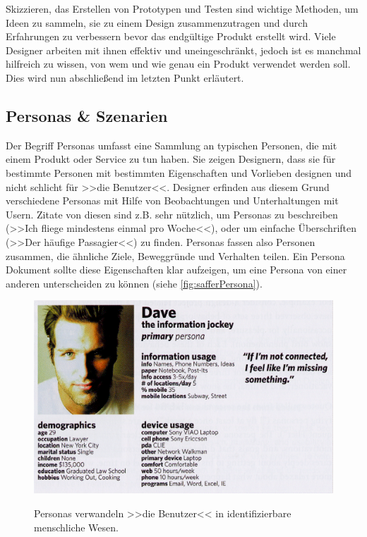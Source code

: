 \medskip Skizzieren, das Erstellen von Prototypen und Testen sind wichtige Methoden, um Ideen zu sammeln, sie zu einem Design zusammenzutragen und durch Erfahrungen zu verbessern bevor das endgültige Produkt erstellt wird. Viele Designer arbeiten mit ihnen effektiv und uneingeschränkt, jedoch ist es manchmal hilfreich zu wissen, von wem und wie genau ein Produkt verwendet werden soll. Dies wird nun abschließend im letzten Punkt erläutert.

\subsection{Personas \& Szenarien}  

Der Begriff Personas umfasst eine Sammlung an typischen Personen, die mit einem Produkt oder Service zu tun haben. Sie zeigen Designern, dass sie für bestimmte Personen mit bestimmten Eigenschaften und Vorlieben designen und nicht schlicht für >>die Benutzer<<. 
Designer erfinden aus diesem Grund verschiedene Personas mit Hilfe von Beobachtungen und Unterhaltungen mit Usern. Zitate von diesen sind z.B. sehr nützlich, um Personas zu beschreiben (>>Ich fliege mindestens einmal pro Woche<<), oder um einfache Überschriften (>>Der häufige Passagier<<) zu finden. Personas fassen also Personen zusammen, die ähnliche Ziele, Beweggründe und Verhalten teilen. Ein Persona Dokument sollte diese Eigenschaften klar aufzeigen, um eine Persona von einer anderen unterscheiden zu können (siehe \autoref{fig:safferPersona}).

\begin{figure}
	\begin{center}
        {\includegraphics[width=\linewidth]{gfx/safferPersona}}
	\end{center}
		\caption[Persona \newline \citep{Saffer:2007}]{Personas verwandeln >>die Benutzer<< in identifizierbare menschliche Wesen.}\label{fig:safferPersona}
\end{figure}

